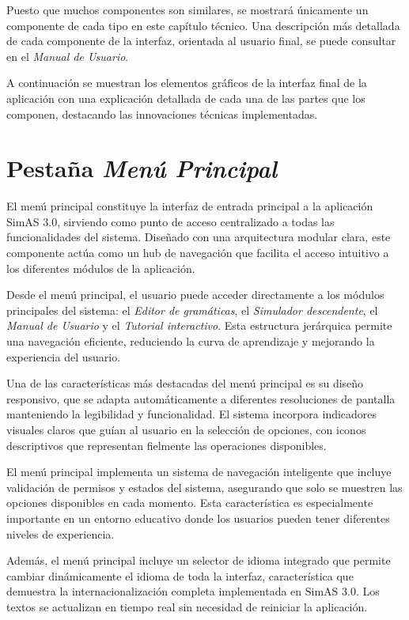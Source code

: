 Puesto que muchos componentes son similares, se mostrará únicamente un componente de cada tipo en este capítulo técnico. Una descripción más detallada de cada componente de la interfaz, orientada al usuario final, se puede consultar en el \textit{Manual de Usuario}.

A continuación se muestran los elementos gráficos de la interfaz final de la aplicación con una explicación detallada de cada una de las partes que los componen, destacando las innovaciones técnicas implementadas.

\section{Pestaña \textit{Menú Principal}}

El menú principal constituye la interfaz de entrada principal a la aplicación SimAS 3.0, sirviendo como punto de acceso centralizado a todas las funcionalidades del sistema. Diseñado con una arquitectura modular clara, este componente actúa como un hub de navegación que facilita el acceso intuitivo a los diferentes módulos de la aplicación.

Desde el menú principal, el usuario puede acceder directamente a los módulos principales del sistema: el \textit{Editor de gramáticas}, el \textit{Simulador descendente}, el \textit{Manual de Usuario} y el \textit{Tutorial interactivo}. Esta estructura jerárquica permite una navegación eficiente, reduciendo la curva de aprendizaje y mejorando la experiencia del usuario.

Una de las características más destacadas del menú principal es su diseño responsivo, que se adapta automáticamente a diferentes resoluciones de pantalla manteniendo la legibilidad y funcionalidad. El sistema incorpora indicadores visuales claros que guían al usuario en la selección de opciones, con iconos descriptivos que representan fielmente las operaciones disponibles.

El menú principal implementa un sistema de navegación inteligente que incluye validación de permisos y estados del sistema, asegurando que solo se muestren las opciones disponibles en cada momento. Esta característica es especialmente importante en un entorno educativo donde los usuarios pueden tener diferentes niveles de experiencia.

Además, el menú principal incluye un selector de idioma integrado que permite cambiar dinámicamente el idioma de toda la interfaz, característica que demuestra la internacionalización completa implementada en SimAS 3.0. Los textos se actualizan en tiempo real sin necesidad de reiniciar la aplicación.

